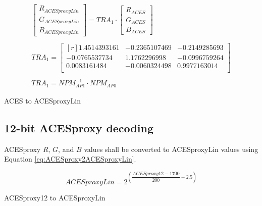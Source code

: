 \begin{floatequ} 
\begin{gather}
    \begin{bmatrix}
        R_{ACESproxyLin}\\
        G_{ACESproxyLin}\\
        B_{ACESproxyLin}
    \end{bmatrix}
    =
    TRA_{1}
    \cdot
    \begin{bmatrix}
        R_{ACES}\\
        G_{ACES}\\
        B_{ACES}
    \end{bmatrix} \\
    \\
    TRA_{1} =
    \begin{bmatrix*}[r]
        1.4514393161 & -0.2365107469 & -0.2149285693 \\
       -0.0765537734 &  1.1762296998 & -0.0996759264 \\
        0.0083161484 & -0.0060324498 &  0.9977163014 \\
    \end{bmatrix*} \\
    \\
    TRA_{1} = NPM^{-1}_{AP1} \cdot NPM_{AP0}
\end{gather}
\caption{ACES to ACESproxyLin}
\label{eq:ACES2ACESproxyLin12}
\end{floatequ}




\subsection{12-bit ACESproxy decoding}
ACESproxy $R$, $G$, and $B$ values shall be converted to ACESproxyLin values using Equation \ref{eq:ACESproxy2ACESproxyLin}.

\begin{floatequ} 
\begin{equation} 
    ACESproxyLin = 2^{\left(\dfrac{ACESproxy12-1700}{200}-2.5\right)}
\end{equation}
\caption{ACESproxy12 to ACESproxyLin}
\label{eq:ACESproxy2ACESproxyLin}
\end{floatequ}

